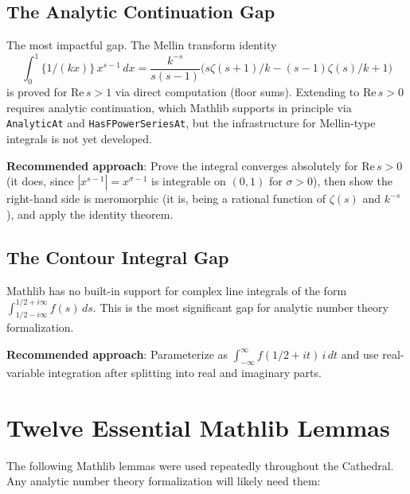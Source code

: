 \documentclass[11pt,a4paper]{article}
\newcommand{\lean}[1]{\texttt{#1}}
\newcommand{\fract}[1]{\{#1\}}
\begin{document}
\subsection{The Analytic Continuation Gap}

The most impactful gap. The Mellin transform identity
\[
  \int_0^1 \fract{1/(kx)}\,x^{s-1}\,dx = \frac{k^{-s}}{s(s-1)}
  \bigl(s\zeta(s+1)/k - (s-1)\zeta(s)/k + 1\bigr)
\]
is proved for $\mathrm{Re}\,s > 1$ via direct computation (floor
sums). Extending to $\mathrm{Re}\,s > 0$ requires analytic
continuation, which Mathlib supports in principle via
\lean{AnalyticAt} and \lean{HasFPowerSeriesAt}, but the
infrastructure for Mellin-type integrals is not yet developed.

\textbf{Recommended approach}: Prove the integral converges
absolutely for $\mathrm{Re}\,s > 0$ (it does, since
$|x^{s-1}| = x^{\sigma-1}$ is integrable on $(0,1)$ for
$\sigma > 0$), then show the right-hand side is meromorphic (it
is, being a rational function of $\zeta(s)$ and $k^{-s}$), and
apply the identity theorem.

\subsection{The Contour Integral Gap}

Mathlib has no built-in support for complex line integrals of the form
$\int_{1/2-i\infty}^{1/2+i\infty} f(s)\,ds$. This is the most significant
gap for analytic number theory formalization.

\textbf{Recommended approach}: Parameterize as
$\int_{-\infty}^{\infty} f(1/2 + it)\,i\,dt$ and use real-variable
integration after splitting into real and imaginary parts.

\section{Twelve Essential Mathlib Lemmas}
\label{sec:lemmas}

The following Mathlib lemmas were used repeatedly throughout the
Cathedral. Any analytic number theory formalization will likely
need them:
\end{document}
